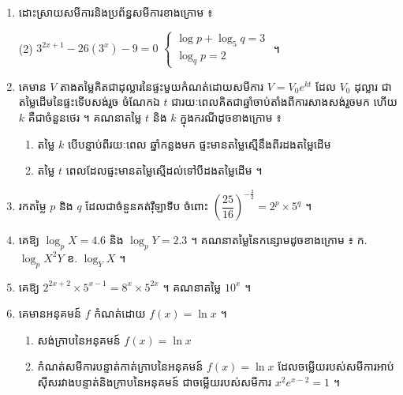 \begin{enumerate}[1]
  \begin{enumerate}[a]
    \item រកតម្លៃម៉ូតូនៅពេលដែលបុរសនោះទិញ ដោយដឹងថាតម្លៃសង្ឃឹមទុករបស់ម៉ូតូបន្ទាប់ពីរយៈពេល $12$ ខែស្មើនឹង ។
    \item គណនាតម្លៃសង្ឃឹមទុករបស់ម៉ូតូបន្ទាប់ពីរយៈពេល $18$ ខែ ។
  \end{enumerate}
  \item ដោះស្រាយសមីការនិងប្រព័ន្ធសមីការខាងក្រោម ៖
  \begin{tasks}(2)
    \task $3^{2x+1} - 26(3^x) - 9 = 0$
    \task $\begin{cases} \log p + \log_5 q = 3\\ \log_q p = 2 \end{cases}$ ។
  \end{tasks}
  \item គេមាន $V$ តាងតម្លៃគិតជាដុល្លារនៃផ្ទះមួយកំណត់ដោយសមីការ $V = V_0e^{kt}$ ដែល $V_0$ ដុល្លារ ជាតម្លៃដើមនៃផ្ទះទើបសង់រួច ចំណែកឯ $t$ ជារយៈពេលគិតជាឆ្នាំចាប់តាំងពីការសាងសង់រួចមក ហើយ $k$ គឺជាចំនួនថេរ ។ គណនាតម្លៃ $t$ និង $k$ ក្នុងករណីដូចខាងក្រោម ៖
  \begin{enumerate}[a]
    \item តម្លៃ $k$ បើបន្ទាប់ពីរយៈពេល ឆ្នាំកន្លងមក ផ្ទះមានតម្លៃស្មើនឹងពីរដងតម្លៃដើម
    \item តម្លៃ $t$ ពេលដែលផ្ទះមានតម្លៃស្មើដល់ទៅបីដងតម្លៃដើម ។
  \end{enumerate}
  \item រកតម្លៃ $p$ និង $q$ ដែលជាចំនួនគត់រ៉ឺឡាទីប ចំពោះ $\left(\dfrac{25}{16}\right)^{-\frac{3}{2}} = 2^p \times 5^q$ ។
  \item គេឱ្យ $\log_p X = 4.6$ និង $\log_p Y = 2.3$ ។ គណនាតម្លៃនៃកន្សោមដូចខាងក្រោម ៖ \quad ក. $\log_p X^2Y$ \qquad ខ. $\log_Y X$ ។
  \item គេឱ្យ $2^{2x+2} \times 5^{x-1} = 8^x \times 5^{2x}$ ។ គណនាតម្លៃ $10^x$ ។
  \item គេមានអនុគមន៍ $f$ កំណត់ដោយ $f(x) = \ln x$ ។
  \begin{enumerate}[a]
    \item សង់ក្រាបនៃអនុគមន៍ $f(x) = \ln x$
    \item កំណត់សមីការបន្ទាត់កាត់ក្រាបនៃអនុគមន៍ $f(x) = \ln x$ ដែលចម្លើយរបស់សមីការអាប់ស៊ីសរវាងបន្ទាត់និងក្រាបនៃអនុគមន៍ ជាចម្លើយរបស់សមីការ $x^2e^{x-2} = 1$ ។
  \end{enumerate}
\end{enumerate}
